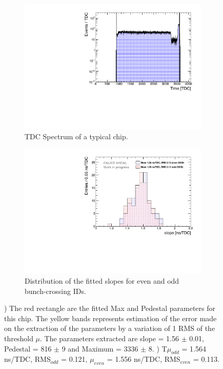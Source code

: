 \begin{figure}[t]
	\begin{subfigure}[t]{0.45\textwidth}
		\centering
		\includegraphics[width=1\linewidth]{chap5/fig_AHCAL_timing/Muons/ExampleTDCSpectra}
		\caption{TDC Spectrum of a typical chip.} \label{fig:TDC_Spectrum}
	\end{subfigure}
	\hfill
	\begin{subfigure}[t]{0.45\textwidth}
		\centering
		\includegraphics[width=1\linewidth]{chap5/fig_AHCAL_timing/Muons/SlopesTDC}
		\caption{Distribution of the fitted slopes for even and odd bunch-crossing IDs.} \label{fig:slope_time}
	\end{subfigure}
	\caption{) The red rectangle are the fitted Max and Pedestal parameters for this chip. The yellow bands represents estimation of the error made on the extraction of the parameters by a variation of 1 RMS of the threshold $\mu$. The parameters extracted are slope = 1.56 $\pm$ 0.01, Pedestal = 816 $\pm$ 9 and Maximum = 3336 $\pm$ 8. ) T$\mu_{odd}$ = 1.564 ns/TDC, RMS$_{odd}$ = 0.121, $\mu_{even}$ = 1.556 ns/TDC, RMS$_{even}$ = 0.113.}
\end{figure}

